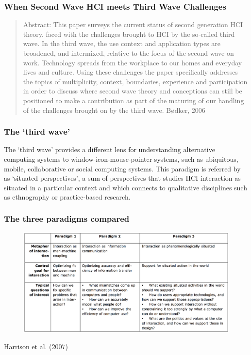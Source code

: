 \documentclass[screen, aspectratio=169]{beamer}
\begin{document}
%
\begin{frame}
\frametitle{When Second Wave HCI meets Third Wave Challenges}
\begin{quote}
Abstract: This paper surveys the current status of second generation HCI theory, faced with the 
challenges brought to HCI by the so-called third wave. In the third wave, the use context and application types are broadened, and intermixed, relative to the focus of the second wave on work. Technology spreads from the workplace to our homes and everyday lives and culture. Using these challenges the paper specifically addresses the topics of multiplicity, context, boundaries, experience and participation in order to discuss where second wave theory and conceptions can still be positioned to make a contribution as part of the maturing of our handling of the challenges brought on by the third wave. B{\o}dker, 2006 \cite{Bodker.2006.second}
\end{quote}
\end{frame}
%
\begin{frame}
\frametitle{The `third wave'}
The `third wave' provides a different lens for understanding alternative computing systems to window-icon-mouse-pointer systems, such as ubiquitous, mobile, collaborative or social computing systems. This paradigm is referred by~\cite{Harrison.et.al.2007.three} as `situated perspectives', a sum of perspectives that studies HCI interaction as situated in a particular context and which connects to qualitative disciplines such as ethnography or practice-based research.
\end{frame}
%
\begin{frame}
\frametitle{The three paradigms compared}
\begin{figure}
\includegraphics[scale=0.18]{img/the-three-HCI-paradigms.png}
\end{figure}
{\scriptsize Harrison et al. (2007) \cite{Harrison.et.al.2007.three}}
\end{frame}
\end{document}
